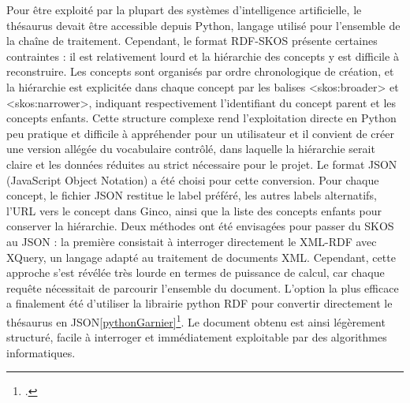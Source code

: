 Pour être exploité par la plupart des systèmes d’intelligence artificielle, le thésaurus devait être accessible depuis Python, langage utilisé pour l’ensemble de la chaîne de traitement. Cependant, le format RDF-SKOS présente certaines contraintes : il est relativement lourd et la hiérarchie des concepts y est difficile à reconstruire. Les concepts sont organisés par ordre chronologique de création, et la hiérarchie est explicitée dans chaque concept par les balises <skos:broader> et <skos:narrower>, indiquant respectivement l’identifiant du concept parent et les concepts enfants. Cette structure complexe rend l’exploitation directe en Python peu pratique et difficile à appréhender pour un utilisateur et il convient de créer une version allégée du vocabulaire contrôlé, dans laquelle la hiérarchie serait claire et les données réduites au strict nécessaire pour le projet. Le format JSON (JavaScript Object Notation) a été choisi pour cette conversion. Pour chaque concept, le fichier JSON restitue le label préféré, les autres labels alternatifs, l’URL vers le concept dans Ginco, ainsi que la liste des concepts enfants pour conserver la hiérarchie. Deux méthodes ont été envisagées pour passer du SKOS au JSON : la première consistait à interroger directement le XML-RDF avec XQuery, un langage adapté au traitement de documents XML. Cependant, cette approche s’est révélée très lourde en termes de puissance de calcul, car chaque requête nécessitait de parcourir l’ensemble du document. L’option la plus efficace a finalement été d’utiliser la librairie python RDF pour convertir directement le thésaurus en JSON\ref{pythonGarnier}\footcite{DocumentationLibrairiePython}. Le document obtenu est ainsi légèrement structuré, facile à interroger et immédiatement exploitable par des algorithmes informatiques.


